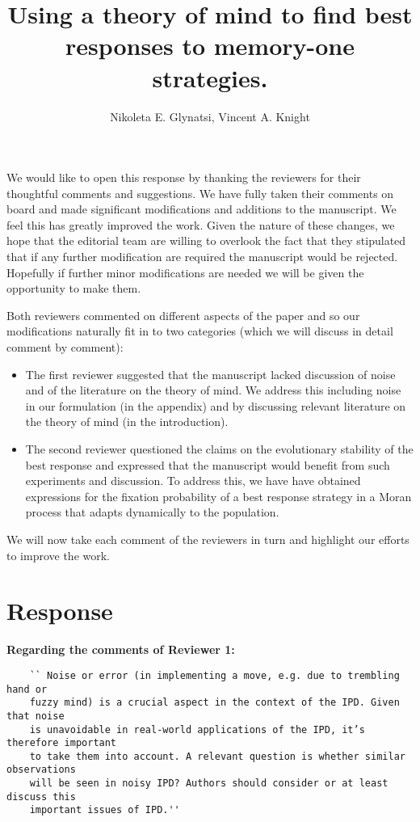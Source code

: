\documentclass{article}
\title{Using a theory of mind to find best responses to memory-one strategies.}
\author{Nikoleta E. Glynatsi, Vincent A. Knight}
\begin{document}
\maketitle

We would like to open this response by thanking the reviewers for their
thoughtful comments and suggestions. We have fully taken their comments on board
and made significant modifications and additions to the manuscript.
We feel this has greatly improved the work. Given the nature of these changes,
we hope that the editorial team are willing to overlook the fact that
they stipulated that if any further modification are required the manuscript
would be rejected. Hopefully if further minor modifications are needed we will
be given the opportunity to make them.

Both reviewers commented on different aspects of the paper and so our
modifications naturally fit in to two categories (which we will discuss in
detail comment by comment):

\begin{itemize}
    \item The first reviewer suggested that the manuscript lacked discussion of
    noise and of the literature on the theory of mind. We address
    this including noise in our formulation (in the appendix) and by discussing
    relevant literature on the theory of mind (in the introduction).
    \item The second reviewer questioned the claims on the evolutionary
    stability of the best response and expressed that the manuscript would
    benefit from such experiments and discussion. To address this, we have
    have obtained expressions for the fixation probability of a best response
    strategy in a Moran process that adapts dynamically to the population.
\end{itemize}

We will now take each comment of the reviewers in turn and highlight our efforts
to improve the work.

\section{Response}

\textbf{Regarding the comments of Reviewer 1:}

\begin{verbatim}
    `` Noise or error (in implementing a move, e.g. due to trembling hand or
    fuzzy mind) is a crucial aspect in the context of the IPD. Given that noise
    is unavoidable in real-world applications of the IPD, it’s therefore important
    to take them into account. A relevant question is whether similar observations
    will be seen in noisy IPD? Authors should consider or at least discuss this
    important issues of IPD.''
\end{verbatim}
\end{document}
